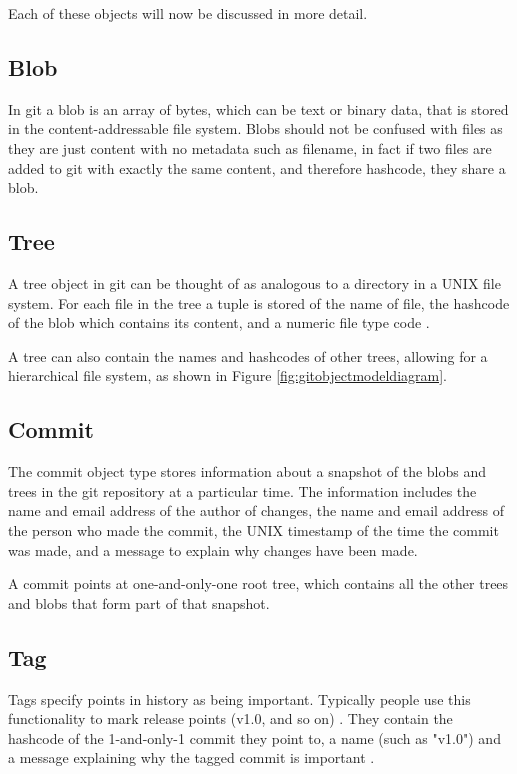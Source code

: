 \documentclass[11pt]{book}
\begin{document}
Each of these objects will now be discussed in more detail.

\subsection{Blob}
In git a blob is an array of bytes, which can be text or binary data, that is stored in the content-addressable file system. Blobs should not be confused with files as they are just content with no metadata such as filename, in fact if two files are added to git with exactly the same content, and therefore hashcode, they share a blob.

\subsection{Tree}
A tree object in git can be thought of as analogous to a directory in a UNIX file system. For each file in the tree a tuple is stored of the name of file, the hashcode of the blob which contains its content, and a numeric file type code \cite{gitmagic}.

A tree can also contain the names and hashcodes of other trees, allowing for a hierarchical file system, as shown in Figure \ref{fig:gitobjectmodeldiagram}. 

\subsection{Commit}
The commit object type stores information about a snapshot of the blobs and trees in the git repository at a particular time. The information includes the name and email address of the author of changes, the name and email address of the person who made the commit, the UNIX timestamp of the time the commit was made, and a message to explain why changes have been made.

A commit points at one-and-only-one root tree, which contains all the other trees and blobs that form part of that snapshot.

\subsection{Tag}
Tags specify points in history as being important. Typically people use this functionality to mark release points (v1.0, and so on) \cite{gitdocstags}. They contain the hashcode of the 1-and-only-1 commit they point to, a name (such as "v1.0") and a message explaining why the tagged commit is important \cite{gitforcomputerscientists}.
\end{document}
